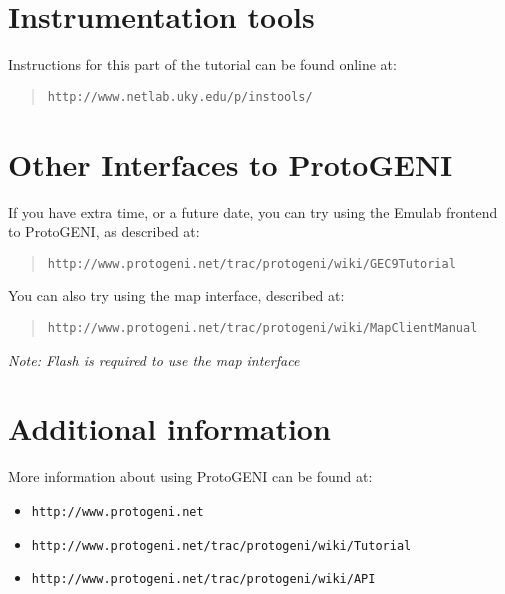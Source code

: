 \documentclass{article}
\begin{document}
\section{Instrumentation tools}
Instructions for this part of the tutorial can be found online at:
\begin{quote}{\tt http://www.netlab.uky.edu/p/instools/}\end{quote}

\section{Other Interfaces to ProtoGENI}
If you have extra time, or a future date, you can try using the Emulab
frontend to ProtoGENI, as described at:
\begin{quote}{\tt http://www.protogeni.net/trac/protogeni/wiki/GEC9Tutorial}\end{quote}

You can also try using the map interface, described at:
\begin{quote}{\tt http://www.protogeni.net/trac/protogeni/wiki/MapClientManual}\end{quote}
{\it Note: Flash is required to use the map interface}


\section{Additional information}
More information about using ProtoGENI can be found at:
\begin{itemize}
\item {\tt http://www.protogeni.net}
\item {\tt http://www.protogeni.net/trac/protogeni/wiki/Tutorial}
\item {\tt http://www.protogeni.net/trac/protogeni/wiki/API}
\end{itemize}
\end{document}
